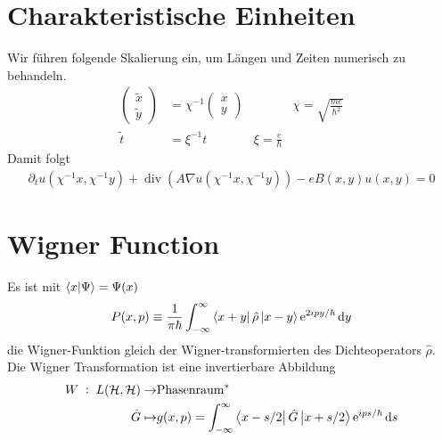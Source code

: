 \section{Charakteristische Einheiten}
Wir führen folgende Skalierung ein, um Längen und Zeiten numerisch zu behandeln.
\begin{align}
  \left(\begin{array}{c}\tilde{x}\\\tilde{y}\end{array}\right) &= \chi^{-1} \left(\begin{array}{c}x\\y\end{array}\right) &  & \chi = \sqrt{\frac{me}{\hbar^2}} \\
  \tilde{t} &= \xi^{-1} t   & \xi = \frac{e}{\hbar}
\end{align}
Damit folgt
\begin{align}
  \partial_t u(\chi^{-1}x,\chi^{-1}y)+\operatorname{div}(A\nabla u(\chi^{-1}x,\chi^{-1}y)) - e B(x,y) u(x,y) = 0
\end{align}


\section{Wigner Function}
Es ist mit $\bra{x}\ket{\Psi} = \Psi(x)$
\begin{equation}
  P(x,p) \equiv \frac{1}{\pi\hbar} \int_{-\infty}^{\infty} \bra{x+y}\hat{\rho} \ket{x-y} \text{e}^{2ipy/\hbar} \mathop{}\!\mathrm{d} y
\end{equation}
die Wigner-Funktion gleich der Wigner-transformierten des Dichteoperators $\hat{\rho}$. Die Wigner Transformation ist eine invertierbare Abbildung
\begin{align}
  W\; :\; L(\mathcal{H},\mathcal{H})  \rightarrow & \text{Phasenraum}^* \\
   \hat{G} \mapsto & g(x,p) = \int_{-\infty}^{\infty} \bra{x-s/2}\hat{G} \ket{x+s/2} \text{e}^{ips/\hbar} \mathop{}\!\mathrm{d} s
\end{align}
